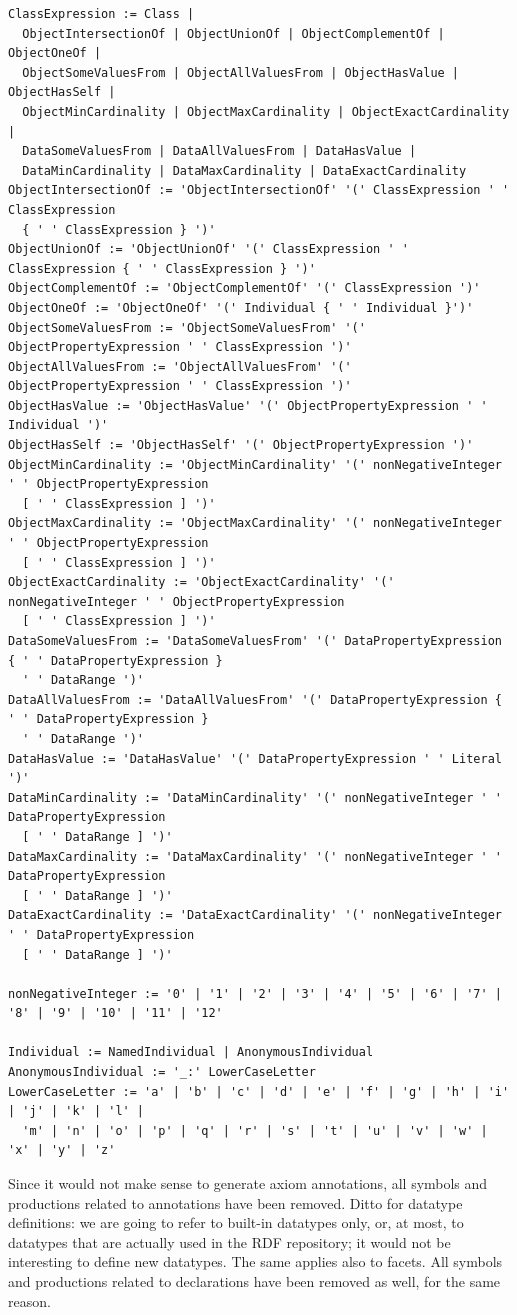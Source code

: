 \documentclass[a4paper]{article}
\begin{document}
\begin{enumerate}
{\begin{verbatim}
ClassExpression := Class |
  ObjectIntersectionOf | ObjectUnionOf | ObjectComplementOf | ObjectOneOf |
  ObjectSomeValuesFrom | ObjectAllValuesFrom | ObjectHasValue | ObjectHasSelf |
  ObjectMinCardinality | ObjectMaxCardinality | ObjectExactCardinality |
  DataSomeValuesFrom | DataAllValuesFrom | DataHasValue |
  DataMinCardinality | DataMaxCardinality | DataExactCardinality
ObjectIntersectionOf := 'ObjectIntersectionOf' '(' ClassExpression ' ' ClassExpression
  { ' ' ClassExpression } ')'
ObjectUnionOf := 'ObjectUnionOf' '(' ClassExpression ' ' ClassExpression { ' ' ClassExpression } ')'
ObjectComplementOf := 'ObjectComplementOf' '(' ClassExpression ')'
ObjectOneOf := 'ObjectOneOf' '(' Individual { ' ' Individual }')'
ObjectSomeValuesFrom := 'ObjectSomeValuesFrom' '(' ObjectPropertyExpression ' ' ClassExpression ')'
ObjectAllValuesFrom := 'ObjectAllValuesFrom' '(' ObjectPropertyExpression ' ' ClassExpression ')'
ObjectHasValue := 'ObjectHasValue' '(' ObjectPropertyExpression ' ' Individual ')'
ObjectHasSelf := 'ObjectHasSelf' '(' ObjectPropertyExpression ')'
ObjectMinCardinality := 'ObjectMinCardinality' '(' nonNegativeInteger ' ' ObjectPropertyExpression
  [ ' ' ClassExpression ] ')'
ObjectMaxCardinality := 'ObjectMaxCardinality' '(' nonNegativeInteger ' ' ObjectPropertyExpression
  [ ' ' ClassExpression ] ')'
ObjectExactCardinality := 'ObjectExactCardinality' '(' nonNegativeInteger ' ' ObjectPropertyExpression
  [ ' ' ClassExpression ] ')'
DataSomeValuesFrom := 'DataSomeValuesFrom' '(' DataPropertyExpression { ' ' DataPropertyExpression }
  ' ' DataRange ')'
DataAllValuesFrom := 'DataAllValuesFrom' '(' DataPropertyExpression { ' ' DataPropertyExpression }
  ' ' DataRange ')'
DataHasValue := 'DataHasValue' '(' DataPropertyExpression ' ' Literal ')'
DataMinCardinality := 'DataMinCardinality' '(' nonNegativeInteger ' ' DataPropertyExpression
  [ ' ' DataRange ] ')'
DataMaxCardinality := 'DataMaxCardinality' '(' nonNegativeInteger ' ' DataPropertyExpression
  [ ' ' DataRange ] ')'
DataExactCardinality := 'DataExactCardinality' '(' nonNegativeInteger ' ' DataPropertyExpression
  [ ' ' DataRange ] ')'

nonNegativeInteger := '0' | '1' | '2' | '3' | '4' | '5' | '6' | '7' | '8' | '9' | '10' | '11' | '12'

Individual := NamedIndividual | AnonymousIndividual
AnonymousIndividual := '_:' LowerCaseLetter
LowerCaseLetter := 'a' | 'b' | 'c' | 'd' | 'e' | 'f' | 'g' | 'h' | 'i' | 'j' | 'k' | 'l' |
  'm' | 'n' | 'o' | 'p' | 'q' | 'r' | 's' | 't' | 'u' | 'v' | 'w' | 'x' | 'y' | 'z'
\end{verbatim}
}
\end{enumerate}
Since it would not make sense to generate axiom annotations, all symbols and productions
related to annotations have been removed. Ditto for datatype definitions: we are going
to refer to built-in datatypes only, or, at most, to datatypes that are actually used
in the RDF repository; it would not be interesting to define new datatypes. The same
applies also to facets.
All symbols and productions related to declarations have been removed as well, for the same reason.
\end{document}
